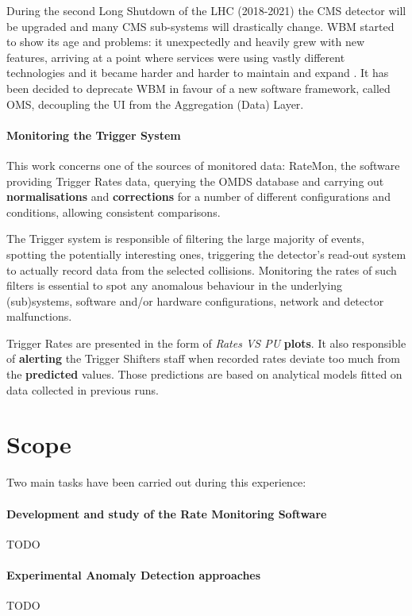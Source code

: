 During the second Long Shutdown of the LHC (2018-2021) the CMS detector will be upgraded and many CMS sub-systems will drastically change. WBM started to show its age and problems: it unexpectedly and heavily grew with new features, arriving at a point where services were using vastly different technologies and it became harder and harder to maintain and expand \cite{CMSWBMreview}. It has been decided to deprecate \cite{upgradewbmoms} WBM in favour of a new software framework, called OMS, decoupling the UI from the Aggregation (Data) Layer.

\paragraph{Monitoring the Trigger System}

This work concerns one of the sources of monitored data: RateMon, the software providing Trigger Rates data, querying the OMDS database and carrying out \textbf{normalisations} and \textbf{corrections} for a number of different configurations and conditions, allowing consistent comparisons.

The Trigger system is responsible of filtering the large majority of events, spotting the potentially interesting ones, triggering the detector's read-out system to actually record data from the selected collisions. Monitoring the rates of such filters is essential to spot any anomalous behaviour in the underlying (sub)systems, software and/or hardware configurations, network and detector malfunctions.

Trigger Rates are presented in the form of \textit{Rates VS PU} \textbf{plots}. It also responsible of \textbf{alerting} the Trigger Shifters staff when recorded rates deviate too much from the \textbf{predicted} values. Those predictions are based on analytical models fitted on data collected in previous runs.

\section{Scope}

Two main tasks have been carried out during this experience:

\paragraph{Development and study of the Rate Monitoring Software} TODO

\paragraph{Experimental Anomaly Detection approaches} TODO


